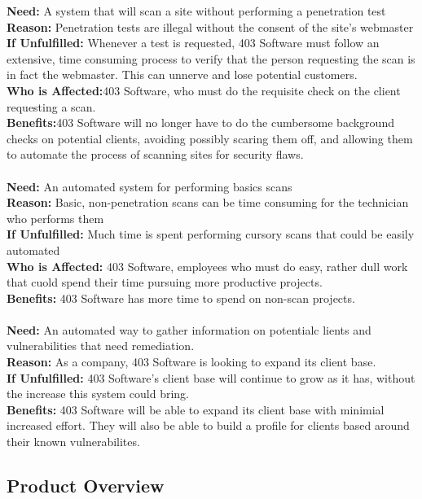 \textbf{Need: }A system that will scan a site without performing a penetration test\\
\textbf{Reason: }Penetration tests are illegal without the consent of the site's webmaster\\
\textbf{If Unfulfilled: }Whenever a test is requested, 403 Software must follow an extensive, time consuming process to verify that the person requesting the scan is in fact the webmaster.  This can unnerve and lose potential customers.\\
\textbf{Who is Affected:}403 Software, who must do the requisite check on the client requesting a scan.\\
\textbf{Benefits:}403 Software will no longer have to do the cumbersome background checks on potential clients, avoiding possibly scaring them off, and allowing them to automate the process of scanning sites for security flaws.\\\\
\textbf{Need: }An automated system for performing basics scans\\
\textbf{Reason: }Basic, non-penetration scans can be time consuming for the technician who performs them\\\textbf{If Unfulfilled:	}Much time is spent performing cursory scans that could be easily automated\\\textbf{Who is Affected:	}403 Software, employees who must do easy, rather dull work that cuold spend their time pursuing more productive projects.\\\textbf{Benefits:	}403 Software has more time to spend on non-scan projects. \\\\
\textbf{Need: }An automated way to gather information on potentialc lients and vulnerabilities that need remediation.\\
\textbf{Reason:	}As a company, 403 Software is looking to expand its client base.\\
\textbf{If Unfulfilled:	}403 Software's client base will continue to grow as it has, without the increase this system could bring.\\
\textbf{Benefits: }403 Software will be able to expand its client base with minimial increased effort.  They will also be able to build a profile for clients based around their known vulnerabilites.

\subsection{Product Overview}

